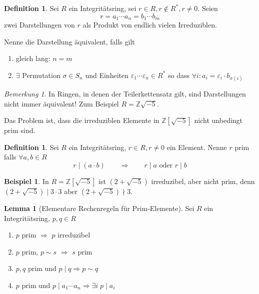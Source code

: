 \documentclass[12pt,parskip=full]{scrartcl}
\newcommand{\setZ}{\mathbb{Z}}
\theoremstyle{definition}
\newtheorem{lemma}[theorem]{Lemma}
\newtheorem{definition}[theorem]{Definition}
\newtheorem{example}[theorem]{Beispiel}
\theoremstyle{remark}
\newtheorem*{remark}{Bemerkung}
\begin{document}
 	\begin{definition}
 		Sei $R$ ein Integritätsring, sei $r \in R, r \notin R^*, r \neq 0$. Seien
 		\begin{equation*}
	 		r = a_1 \cdots a_n = b_1 \cdots b_m
 		\end{equation*}
 		zwei Darstellungen von $r$ als Produkt von endlich vielen Irreduziblen.
 		
 		Nenne die Darstellung äquivalent, falls gilt
 		\begin{enumerate}
 			\item gleich lang: $n = m$
 			\item $\exists$ Permutation $\sigma \in S_n$ und Einheiten $\varepsilon_1 \cdots \varepsilon_n \in R^*$ so dass $\forall i: a_i = \varepsilon_i \cdot b_{\sigma(i)}$
 		\end{enumerate}
 	\end{definition}
 
 	\begin{remark}
 		In Ringen, in denen der Teilerkettensatz gilt, sind Darstellungen nicht immer äquivalent! Zum Beispiel $R = \setZ{\sqrt{-5}}$.
 		
 		Das Problem ist, dass die irreduziblen Elemente in $\setZ[\sqrt{-5}]$ nicht unbedingt prim sind.
 	\end{remark}

	\begin{definition}
		Sei $R$ ein Integritätsring, $r \in R, r \neq 0$ ein Element. Nenne $r$ prim falls $\forall a,b \in R$
		\begin{equation*}
			r \mid (a \cdot b) \qquad \Longrightarrow \qquad r \mid a \text{ oder } r \mid b
		\end{equation*}
	\end{definition}

	\begin{example}
		In $R = \setZ[\sqrt{-5}]$ ist $(2 + \sqrt{-5})$ irreduzibel, aber  nicht prim, denn $(2 + \sqrt{-5}) \mid 3 \cdot 3$ aber $(2 + \sqrt{-5}) \nmid 3$.
	\end{example}

	\begin{lemma}[Elementare Rechenregeln für Prim-Elemente]
		Sei $R$ ein Integritätsring, $p,q \in R$
		\begin{enumerate}
			\item $p$ prim $\Rightarrow$ $p$ irreduzibel
			\item $p$ prim, $p \sim s$ $\Rightarrow$ $s$ prim
			\item $p,q$ prim und $p \mid q \Rightarrow p \sim q$
			\item $p$ prim und $p \mid a_1 \cdots a_n \Rightarrow \exists i \; p \mid a_i$
		\end{enumerate}
	\end{lemma}
\end{document}
